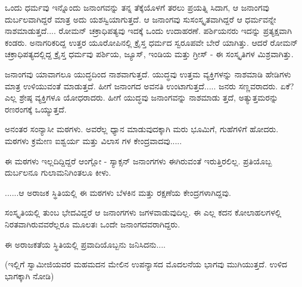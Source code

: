 ಒಂದು ಧರ್ಮವು ಇನ್ನೊಂದು ಜನಾಂಗವನ್ನು ತನ್ನ ತೆಕ್ಕೆಯೊಳಗೆ ತರಲು ಪ್ರಯತ್ನಿ ಸಿದಾಗ, ಆ ಜನಾಂಗವು ದುರ್ಬಲವಾಗಿದ್ದರೆ ಮಾತ್ರ ಅದು ಯಶಸ್ವಿಯಾಗುತ್ತದೆ. ಆ ಜನಾಂಗವು ಸುಸಂಸ್ಕೃತವಾಗಿದ್ದರೆ ಆ ಧರ್ಮವನ್ನೇ ನಾಶಮಾಡುತ್ತದೆ.... ರೋಮನ್ ಚಕ್ರಾಧಿಪತ್ಯವು ಇದಕ್ಕೆ ಒಂದು ಉದಾಹರಣೆ. ಪರ್ಶಿಯನರು ಇದನ್ನು ಪ್ರತ್ಯಕ್ಷವಾಗಿ ಕಂಡರು. ಅನಾಗರಿಕರಿದ್ದ ಉತ್ತರ ಯೂರೋಪಿನಲ್ಲಿ ಕ್ರೈಸ್ತ ಧರ್ಮದ ಸ್ವರೂಪವೇ ಬೇರೆ ಯಾಗಿತ್ತು. ಆದರೆ ರೋಮನ್ ಚಕ್ರಾಧಿಪತ್ಯದಲ್ಲಿದ್ದ ಕ್ರೈಸ್ತ ಧರ್ಮವು ಪರ್ಶಿಯ, ಜ್ಯೂಸ್, ಇಂಡಿಯ ಮತ್ತು ಗ್ರೀಸ್ - ಈ ಸಂಸ್ಕೃತಿಗಳ ಮಿಶ್ರವಾಗಿತ್ತು.

\delimiter

ಜನಾಂಗವು ಯಾವಾಗಲೂ ಯುದ್ಧದಿಂದ ನಾಶವಾಗುತ್ತದೆ. ಯುದ್ಧವು ಉತ್ತಮ ವ್ಯಕ್ತಿಗಳನ್ನು ನಾಶಮಾಡಿ ಹೇಡಿಗಳು ಮಾತ್ರ ಉಳಿಯುವಂತೆ ಮಾಡುತ್ತದೆ. ಹೀಗೆ ಜನಾಂಗದ ಅವನತಿ ಉಂಟಾಗುತ್ತದೆ..... ಜನರು ಸಣ್ಣವರಾದರು. ಏಕೆ? ಎಲ್ಲ ಶ್ರೇಷ್ಠ ವ್ಯಕ್ತಿಗಳೂ ಯೋಧರಾದರು. ಹೀಗೆ ಯುದ್ಧವು ಜನಾಂಗವನ್ನು ನಾಶಮಾಡು ತ್ತದೆ, ಅತ್ಯುತ್ತಮರನ್ನು ರಣರಂಗಕ್ಕೆ ಒಯ್ಯುತ್ತದೆ.

ಅನಂತರ ಸಂನ್ಯಾಸೀ ಮಠಗಳು. ಅವರೆಲ್ಲ ಧ್ಯಾನ ಮಾಡುವುದಕ್ಕಾಗಿ ಮರು ಭೂಮಿಗೆ, ಗುಹೆಗಳಿಗೆ ಹೋದರು. ಮಠಗಳು ಕ್ರಮೇಣ ಐಶ್ವರ್ಯ ಮತ್ತು ವಿಲಾಸ ಗಳ ಕೇಂದ್ರವಾದವು.....

ಈ ಮಠಗಳು ಇಲ್ಲದಿದ್ದಿದ್ದರೆ ಆಂಗ್ಲೋ - ಸ್ಯಾಕ್ಸನ್ ಜನಾಂಗಗಳು ಈಗಿರುವಂತೆ ಇರುತ್ತಿರಲಿಲ್ಲ. ಪ್ರತಿಯೊಬ್ಬ ದುರ್ಬಲನೂ ಗುಲಾಮನಿಗಿಂತಲೂ ಕೀಳು.

......ಆ ಅರಾಜಕ ಸ್ಥಿತಿಯಲ್ಲಿ ಈ ಮಠಗಳು ಬೆಳಕಿನ ಮತ್ತು ರಕ್ಷಣೆಯ ಕೇಂದ್ರಗಳಾಗಿದ್ದವು.

ಸಂಸ್ಕೃತಿಯಲ್ಲಿ ತುಂಬ ಭೇದವಿದ್ದರೆ ಆ ಜನಾಂಗಗಳು ಜಗಳವಾಡುವುದಿಲ್ಲ. ಈ ಎಲ್ಲ ಕದನ ಕೋಲಾಹಲಗಳಲ್ಲಿ ನಿರತವಾಗಿರುವವರೆಲ್ಲರೂ ಮೂಲತಃ ಒಂದೇ ಜನಾಂಗದವರಾಗಿದ್ದರು.

ಈ ಅರಾಜಕತೆಯ ಸ್ಥಿತಿಯಲ್ಲಿ ಪ್ರವಾದಿಯೊಬ್ಬನು ಜನಿಸಿದನು....

(ಇಲ್ಲಿಗೆ ಸ್ವಾಮೀಜಿಯವರ ಮಹಮದನ ಮೇಲಿನ ಉಪನ್ಯಾಸದ ಮೊದಲನೆಯ ಭಾಗವು ಮುಗಿಯುತ್ತದೆ. ಉಳಿದ ಭಾಗಕ್ಕಾಗಿ  ನೋಡಿ)

